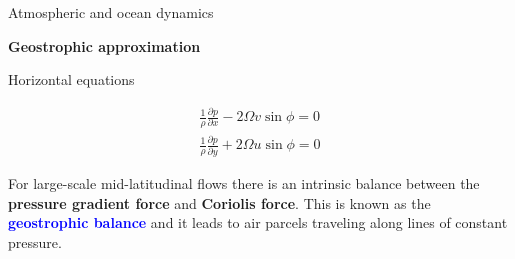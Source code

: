\documentclass[aspectratio=169,xcolor=dvipsnames]{beamer}
\newcommand\boldblue[1]{\textcolor{blue}{\textbf{#1}}}
\begin{document}
\begin{frame}[t]{Atmospheric and ocean dynamics}

\vspace{-1.0em}

\begin{center}
\textbf{{\large
Geostrophic approximation
}}
\end{center}

\small 
\center 

\vspace{-0.5em}

Horizontal equations

\vspace{-0.5em}

\normalsize

\begin{align*}
    \frac{1}{\rho}\frac{\partial p}{\partial x}
    -2\Omega v \sin\phi
    = 0
    \\
    \frac{1}{\rho}\frac{\partial p}{\partial y}
    +2\Omega u \sin\phi
    = 0
\end{align*}

\vspace{0.5em}

\begin{minipage}{0.8\textwidth}
\begin{flushleft}
    For large-scale mid-latitudinal flows there is an
intrinsic balance between the \textbf{pressure gradient force} and \textbf{Coriolis
force}. This is known as the \boldblue{geostrophic balance} and it leads to
air parcels traveling along lines of constant pressure.
\end{flushleft}
\end{minipage}

\end{frame}
\end{document}
